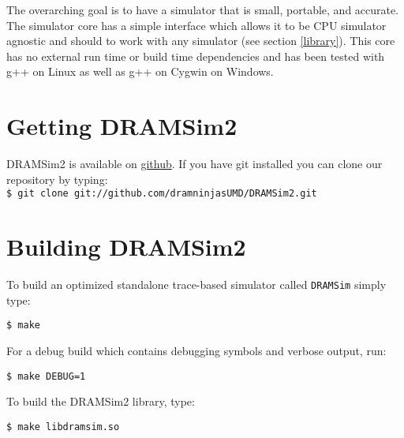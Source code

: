 \documentclass[11pt]{article}
\begin{document}
	The overarching goal is to have a simulator that is small,
	portable, and accurate. The simulator core has a simple interface 
	which allows it to be CPU simulator agnostic and should to work with any simulator (see section \ref{library}).  This core has no external run
	time or build time dependencies and has been tested with g++ on Linux
	as well as g++ on Cygwin on Windows.  

\section{Getting DRAMSim2}

DRAMSim2 is available on \href{http://github.com/dramninjasUMD}{github}. If you have git installed you can clone our repository by typing:\\

\texttt{\$ git clone git://github.com/dramninjasUMD/DRAMSim2.git }



\section{Building DRAMSim2}
	To build an optimized standalone trace-based simulator called \texttt{DRAMSim} simply type:

	\texttt{\$ make}

	For a debug build which contains debugging symbols and verbose output, run:

	\texttt{\$ make DEBUG=1}

	To build the DRAMSim2 library, type: 

	\texttt{\$ make libdramsim.so }
\end{document}
